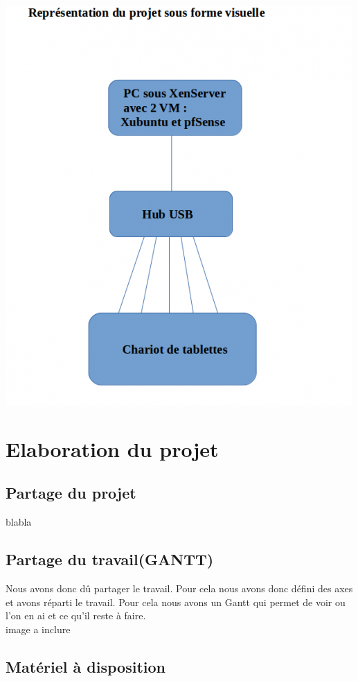 \documentclass[a4paper,12pt]{article}
\begin{document}
\includegraphics{representation_projet}

\clearpage
\section{Elaboration du projet}
\subsection{Partage du projet}

blabla

\subsection{Partage du travail(GANTT)}

Nous avons donc dû partager le travail. Pour cela nous avons donc défini des axes et avons réparti le travail. Pour cela nous avons un Gantt qui permet de voir ou l’on en ai et ce qu’il reste à faire.\\

image a inclure

\subsection{Matériel à disposition}
\end{document}
